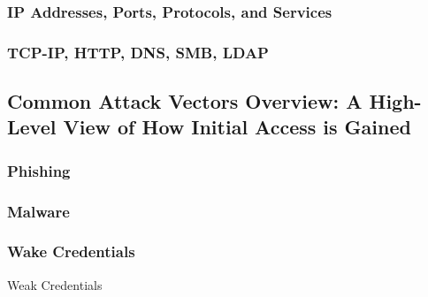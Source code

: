 \documentclass{article}
\begin{document}
\subsubsection{IP Addresses, Ports, Protocols, and Services}
\subsubsection{TCP-IP, HTTP, DNS, SMB, LDAP}
\subsection{Common Attack Vectors Overview: A High-Level View of How Initial Access is Gained}
\subsubsection{Phishing}
\subsubsection{Malware}
\subsubsection{Wake Credentials}Weak Credentials
\end{document}
